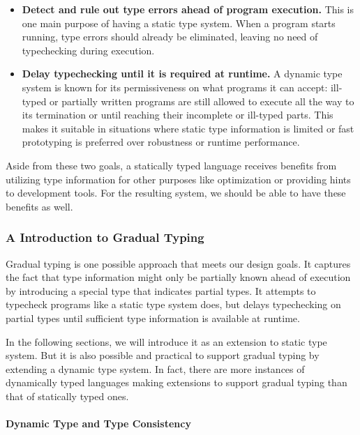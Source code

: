 \begin{itemize}
	\item \textbf{Detect and rule out type errors ahead of program execution.}
	This is one main purpose of having a static type system.
	When a program starts running, type errors should already be eliminated,
	leaving no need of typechecking during execution.

	\item \textbf{Delay typechecking until it is required at runtime.}
	A dynamic type system is known for its permissiveness on what programs it can accept:
	ill-typed or partially written programs are still allowed to execute
	all the way to its termination or until reaching their incomplete or ill-typed parts.
	This makes it suitable in situations where static type information
	is limited or fast prototyping is preferred over robustness or runtime performance.
\end{itemize}

Aside from these two goals,
a statically typed language receives benefits from
utilizing type information for other purposes like
optimization or providing hints to development tools.
For the resulting system, we should be able to have these benefits as well.

\subsubsection{A Introduction to Gradual Typing}

\newcommand{\dyn}{\textbf{dyn}}

Gradual typing \cite{siek2006gradual} is one possible approach that meets our design goals.
It captures the fact that type information might only be partially known
ahead of execution by introducing a special type that indicates partial types.
It attempts to typecheck programs like a static type system does, but delays
typechecking on partial types until sufficient type information is available
at runtime.

In the following sections, we will introduce it
as an extension to static type system.
But it is also possible and practical to support gradual typing by
extending a dynamic type system.
In fact, there are more instances of dynamically typed languages
making extensions to support gradual typing than that of statically typed ones.

\paragraph{Dynamic Type and Type Consistency}

